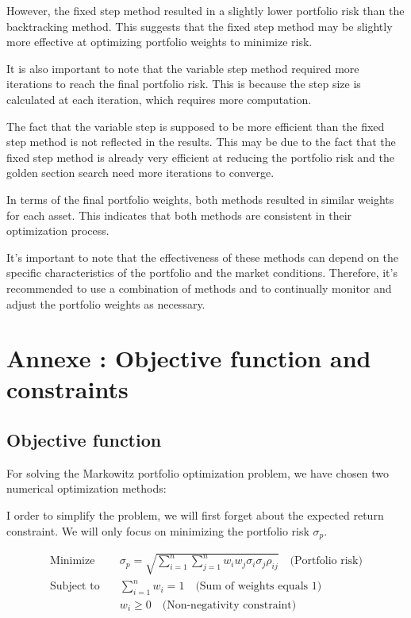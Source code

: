 \documentclass[12pt]{article}
\begin{document}
However, the fixed step method resulted in a slightly lower portfolio risk than the backtracking method. This suggests that the fixed step method may be slightly more effective at optimizing portfolio weights to minimize risk. 

It is also important to note that the variable step method required more iterations to reach the final portfolio risk. This is because the step size is calculated at each iteration, which requires more computation. 

The fact that the variable step is supposed to be more efficient than the fixed step method is not reflected in the results. This may be due to the fact that the fixed step method is already very efficient at reducing the portfolio risk and the golden section search need more iterations to converge.

In terms of the final portfolio weights, both methods resulted in similar weights for each asset. This indicates that both methods are consistent in their optimization process. 

It's important to note that the effectiveness of these methods can depend on the specific characteristics of the portfolio and the market conditions. Therefore, it's recommended to use a combination of methods and to continually monitor and adjust the portfolio weights as necessary.



\section*{Annexe : Objective function and constraints}

\subsection*{Objective function}

For solving the Markowitz portfolio optimization problem, we have chosen two numerical optimization methods:


I order to simplify the problem, we will first forget about the expected return constraint. We will only focus on minimizing the portfolio risk $\sigma_p$.

\begin{equation}
    \begin{aligned}
        \text{Minimize} \quad   & \sigma_p = \sqrt{\sum_{i=1}^{n}\sum_{j=1}^{n} w_i w_j \sigma_i \sigma_j \rho_{ij}} \quad \text{(Portfolio risk)} \\
        \text{Subject to} \quad & \sum_{i=1}^{n} w_i = 1 \quad \text{(Sum of weights equals 1)}                                                        \\
                                & w_i \geq 0 \quad \text{(Non-negativity constraint)}
    \end{aligned}
\end{equation}
\end{document}
